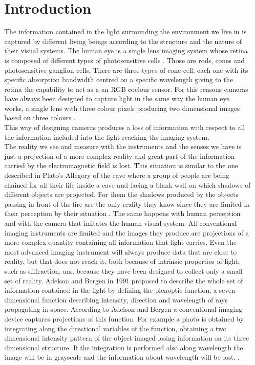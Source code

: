 \chapter*{Introduction}
\label{intro}
The information contained in the light surrounding the environment we live in is captured by different living beings according to the structure and the nature of their visual systems. The human eye is a single lens imaging system whose retina is composed of different types of photosensitive cells \cite{hart1992adler}. Those are rods, cones and photosensitive ganglion cells. There are three types of cone cell, each one with its specific absorption bandwidth centred on a specific wavelength giving to the retina the capability to act as a an RGB coclour sensor. For this reasons cameras have always been designed to capture light in the same way the human eye works, a single lens with three colour pixels producing two dimensional images based on three colours \cite{wetzstein2011computational}. \\
This way of designing cameras produces a loss of information with respect to all the information included into the light reaching the imaging system.\\
 The reality we see and measure with the instruments and the senses we have is just a projection of a more complex reality and great part of the information carried by the electromagnetic field is lost. This situation is similar to the one described in Plato's Allegory of the cave where a group of people are being chained for all their life inside a cave and facing a blank wall on which shadows of different objects are projected. For them the shadows produced by the objects passing in front of the fire are the only reality they know since they are limited in their perception by their situation \cite{plato1945republic} . The same happens with human perception and with the camera that imitates the human visual system. All conventional imaging instruments are limited and the images they produce are projections of a more complex quantity containing all information that light carries. Even the most advanced imaging instrument will always produce data that are close to reality, but that does not reach it, both because of intrinsic properties of light, such as diffraction, and because they have been designed to collect only a small set of reality. 
 Adelson and Bergen \cite{adelson1991plenoptic} in 1991 proposed to describe the whole set of information contained in the light by defining the plenoptic function, a seven dimensional function describing intensity, direction and wavelength of rays propagating in space. According to Adelson and Bergen a conventional imaging device captures projections of this function. For example a photo is obtained by integrating along the directional variables of the function, obtaining a two dimensional intensity pattern of the object imaged losing information on its three dimensional structure. If the integration is performed also along wavelength the image will be in grayscale and the information about wavelength will be lost. \cite{adelson1992single,ng2006digital}.

